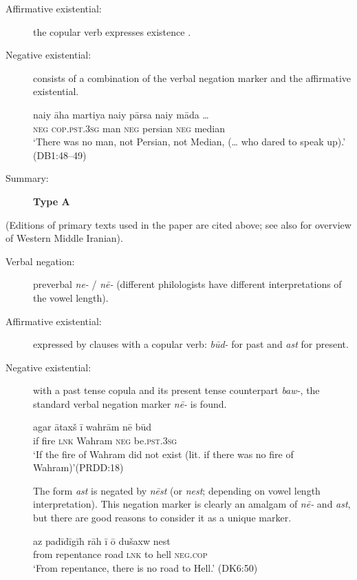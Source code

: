 \documentclass[output=paper,colorlinks,citecolor=brown]{langscibook}
\begin{document}
\begin{paperappendix}
\begin{unindented}
\begin{description}
\item[Affirmative existential:] the copular verb expresses existence \citep[134]{Skjærvø2009b}.

\item[Negative existential:] consists of a combination of the verbal negation
marker and the affirmative existential.
%
\begin{exe}\ex
    \gll naiy āha martiya   naiy  pārsa   naiy māda … \\
\textsc{neg} \textsc{cop.pst.3sg} man \textsc{neg} persian  \textsc{neg} median \\
    \glt `There was no man, not Persian, not Median, (… who dared to speak up).' (DB1:48--49)
    \end{exe}

\item[Summary:] \textbf{Type A}
\end{description}

(Editions of primary texts used in the paper are cited above; see also \citet{Skjærvø2009a} for overview of Western Middle Iranian).

\begin{description}
\item[Verbal negation:] preverbal \textit{ne-} / \textit{nē-} (different philologists have different interpretations of the vowel length). 

\item[Affirmative existential:] expressed by clauses with a copular verb: \textit{būd-} for past and \textit{ast} for present.

\item[Negative existential:] with a past tense copula and its present tense counterpart \textit{baw-}, the standard verbal negation marker \textit{nē-} is found.
%
\begin{exe}\ex
    \gll agar ātaxš ī        wahrām  nē     būd \\
if      fire    \textsc{lnk}   Wahram \textsc{neg}  be.\textsc{pst.3sg} \\
    \glt `If the fire of Wahram did not exist (lit. if there was no fire of Wahram)'(PRDD:18)
    \end{exe}

The form \textit{ast} is negated by \textit{nēst} (or \textit{nest}; depending on vowel length interpretation). This negation marker is clearly an amalgam of \textit{nē-} and \textit{ast}, but there are good reasons to consider it as a unique marker.
%
\begin{exe}\ex
    \gll az      padīdīgīh   rāh  ī        ō dušaxw nest \\
from repentance road \textsc{lnk}   to hell      \textsc{neg.cop} \\
    \glt `From repentance, there is no road to Hell.' (DK6:50)
    \end{exe}


\end{description}
\end{unindented}
\end{paperappendix}
\end{document}
